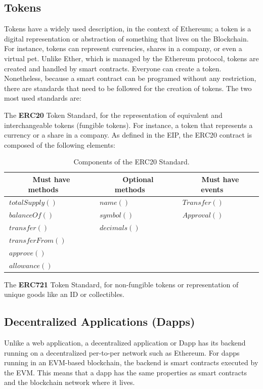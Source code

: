 \documentclass[11pt,a4paper]{report}
\begin{document}
\subsection{Tokens}\label{sec:tokens}
Tokens have a widely used description\cite{wiki:Token}, in the context of Ethereum; a token\cite{tokens} is a digital representation or abstraction of something that lives on the Blockchain. For instance, tokens can represent currencies, shares in a company, or even a virtual pet. Unlike Ether, which is managed by the Ethereum protocol, tokens are created and handled by smart contracts. Everyone can create a token. Nonetheless, because a smart contract can be programed without any restriction, there are standards that need to be followed for the creation of tokens. The two most used standards are:

The \textbf{ERC20} Token Standard\cite{erc20}, for the representation of equivalent and interchangeable tokens (fungible tokens). For instance, a token that represents a currency or a share in a company. As defined in the EIP\cite{erc20}, the ERC20 contract is composed of the following elements:
\begin{table}[htp]
	\centering
	\begin{tabular}{|l|l|l|}
		\hline
		\multicolumn{1}{|c|}{\textbf{~Must have methods~~~}} & 
		\multicolumn{1}{|c|}{\textbf{~Optional methods~~~}}  &
		\multicolumn{1}{|c|}{\textbf{~Must have events~~~}} \\\hline
		 $~totalSupply()$& $~name()$  & $~Transfer()$  \\
		 $~balanceOf()$& $~symbol()$ & $~Approval()$  \\
		 $~transfer()$& $~decimals()$  &  \\
		 $~transferFrom()$&  &   \\
		 $~approve()$&  &   \\
		 $~allowance()$&  &   \\\hline		 
	\end{tabular}
	\caption{Components of the ERC20 Standard.}
	\label{tab:erc20}
\end{table}



The \textbf{ERC721} Token Standard\cite{erc721}, for non-fungible tokens or representation of unique goods like an ID or collectibles.

\subsection{Decentralized Applications (Dapps)}\label{sec:dapps}
Unlike a web application, a decentralized application or Dapp\cite{book:dapps}\cite{dapps}\cite{dapps_arch} has its backend running on a decentralized per-to-per network such as Ethereum. For dapps running in an EVM-based blockchain, the backend is smart contracts executed by the EVM. This means that a dapp has the same properties as smart contracts and the blockchain network where it lives.
\end{document}

